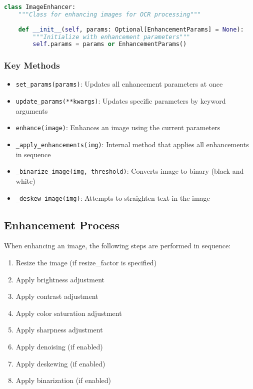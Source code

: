 \begin{lstlisting}[language=Python, caption=ImageEnhancer Class Definition]
class ImageEnhancer:
    """Class for enhancing images for OCR processing"""
    
    def __init__(self, params: Optional[EnhancementParams] = None):
        """Initialize with enhancement parameters"""
        self.params = params or EnhancementParams()
\end{lstlisting}

\subsubsection{Key Methods}
\begin{itemize}
    \item \texttt{set\_params(params)}: Updates all enhancement parameters at once
    \item \texttt{update\_params(**kwargs)}: Updates specific parameters by keyword arguments
    \item \texttt{enhance(image)}: Enhances an image using the current parameters
    \item \texttt{\_apply\_enhancements(img)}: Internal method that applies all enhancements in sequence
    \item \texttt{\_binarize\_image(img, threshold)}: Converts image to binary (black and white)
    \item \texttt{\_deskew\_image(img)}: Attempts to straighten text in the image
\end{itemize}

\subsection{Enhancement Process}
When enhancing an image, the following steps are performed in sequence:

\begin{enumerate}
    \item Resize the image (if resize\_factor is specified)
    \item Apply brightness adjustment
    \item Apply contrast adjustment
    \item Apply color saturation adjustment
    \item Apply sharpness adjustment
    \item Apply denoising (if enabled)
    \item Apply deskewing (if enabled)
    \item Apply binarization (if enabled)
\end{enumerate}

